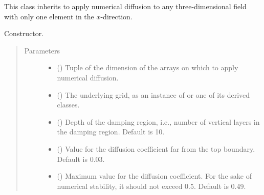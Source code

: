 \documentclass[letterpaper,10pt,english]{sphinxmanual}
\begin{document}

\begin{fulllineitems}
\label{\detokenize{api:dycore.diffusion.DiffusionYZ}}
This class inherits {\hyperref[\detokenize{api:dycore.diffusion.Diffusion}]{}} to apply numerical diffusion to any three-dimensional
field with only one element in the \(x\)-direction.

\begin{fulllineitems}
\label{\detokenize{api:dycore.diffusion.DiffusionYZ.__init__}}
Constructor.
\begin{quote}\begin{description}
\item[{Parameters}] \leavevmode\begin{itemize}
\item {} 
 () \textendash{} Tuple of the dimension of the arrays on which to apply numerical diffusion.

\item {} 
 () \textendash{} The underlying grid, as an instance of {\hyperref[\detokenize{api:grids.grid_xyz.GridXYZ}]{}} or one of its derived classes.

\item {} 
 () \textendash{} Depth of the damping region, i.e., number of vertical layers in the damping region. Default is 10.

\item {} 
 () \textendash{} Value for the diffusion coefficient far from the top boundary. Default is 0.03.

\item {} 
 () \textendash{} Maximum value for the diffusion coefficient. For the sake of numerical stability, it should not
exceed 0.5. Default is 0.49.


\end{itemize}
\end{description}
\end{quote}
\end{fulllineitems}
\end{fulllineitems}
\end{document}
